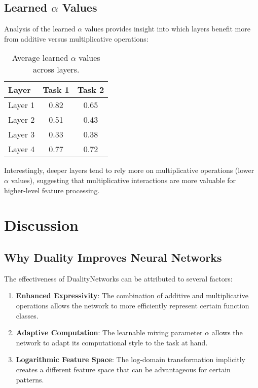 \documentclass{article}
\begin{document}
\subsection{Learned $\alpha$ Values}

Analysis of the learned $\alpha$ values provides insight into which layers benefit more from additive versus multiplicative operations:

\begin{table}[h]
\centering
\begin{tabular}{lcc}
\hline
\textbf{Layer} & \textbf{Task 1} & \textbf{Task 2} \\
\hline
Layer 1 & 0.82 & 0.65 \\
Layer 2 & 0.51 & 0.43 \\
Layer 3 & 0.33 & 0.38 \\
Layer 4 & 0.77 & 0.72 \\
\hline
\end{tabular}
\caption{Average learned $\alpha$ values across layers.}
\end{table}

Interestingly, deeper layers tend to rely more on multiplicative operations (lower $\alpha$ values), suggesting that multiplicative interactions are more valuable for higher-level feature processing.

\section{Discussion}

\subsection{Why Duality Improves Neural Networks}

The effectiveness of DualityNetworks can be attributed to several factors:

\begin{enumerate}
    \item \textbf{Enhanced Expressivity}: The combination of additive and multiplicative operations allows the network to more efficiently represent certain function classes.
    
    \item \textbf{Adaptive Computation}: The learnable mixing parameter $\alpha$ allows the network to adapt its computational style to the task at hand.
    
    \item \textbf{Logarithmic Feature Space}: The log-domain transformation implicitly creates a different feature space that can be advantageous for certain patterns.
\end{enumerate}
\end{document}
